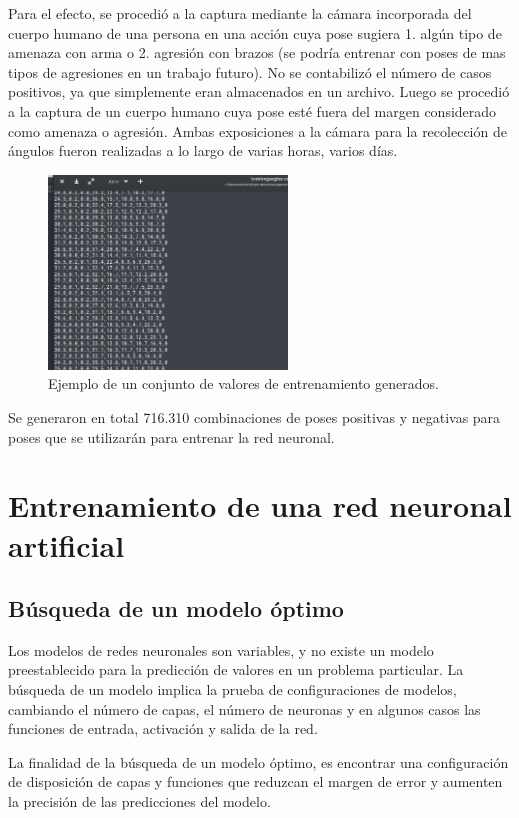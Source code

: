 \documentclass[a4paper,12pt,oneside,spanish]{book}
\begin{document}
Para el efecto, se procedió a la captura mediante la cámara incorporada del cuerpo humano de una persona en una acción cuya pose sugiera 1. algún tipo de amenaza con arma o 2. agresión con brazos (se podría entrenar con poses de mas tipos de agresiones en un trabajo futuro). No se contabilizó el número de casos positivos, ya que simplemente eran almacenados en un archivo. Luego se procedió a la captura de un cuerpo humano cuya pose esté fuera del margen considerado como amenaza o agresión. Ambas exposiciones a la cámara para la recolección de ángulos fueron realizadas a lo largo de varias horas, varios días.\par

\begin{figure}[h!]
	\includegraphics[width=180pt]{Imagenes/dataset2.jpg}
	\centering	
	\caption{Ejemplo de un conjunto de valores de entrenamiento generados.}
	\label{fig:dataset2}
\end{figure}

Se generaron en total 716.310 combinaciones de poses positivas y negativas para poses que se utilizarán para entrenar la red neuronal.

\section{Entrenamiento de una red neuronal artificial}
\subsection{Búsqueda de un modelo óptimo}
Los modelos de redes neuronales son variables, y no existe un modelo preestablecido para la predicción de valores en un problema particular. La búsqueda de un modelo implica la prueba de configuraciones de modelos, cambiando el número de capas, el número de neuronas y en algunos casos las funciones de entrada, activación y salida de la red.\par

La finalidad de la búsqueda de un modelo óptimo, es encontrar una configuración de disposición de capas y funciones que reduzcan el margen de error y aumenten la precisión de las predicciones del modelo.\par
\end{document}
